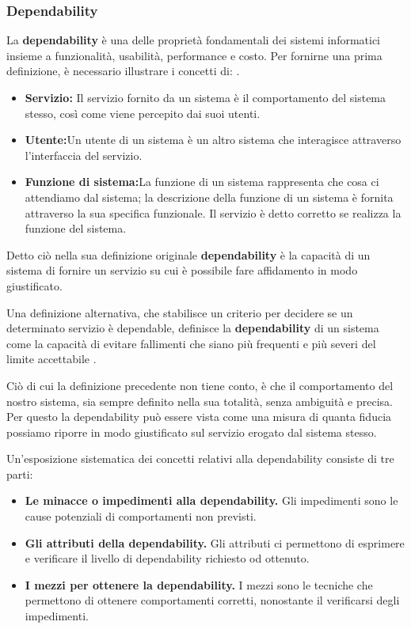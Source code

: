 \documentclass[14pt]{extarticle}
\begin{document}
\subsubsection{Dependability}
La \textbf{dependability} è una delle proprietà fondamentali dei sistemi informatici insieme a funzionalità, usabilità, performance e costo. Per fornirne una prima definizione, è necessario illustrare i concetti di: \cite{avizienis2004basic}.
\begin{itemize}
\item \textbf{Servizio:} Il servizio fornito da un sistema è il comportamento del sistema stesso, così come viene percepito dai suoi utenti.
\item \textbf{Utente:}Un utente di un sistema è un altro sistema che interagisce attraverso l’interfaccia del servizio.
\item \textbf{Funzione di sistema:}La funzione di un sistema rappresenta che cosa ci attendiamo dal sistema; la descrizione della funzione di un sistema è fornita attraverso la sua specifica funzionale. Il servizio è detto corretto se realizza la funzione del sistema.
\end{itemize}

Detto ciò nella sua definizione originale \textbf{dependability} è
la capacità di un sistema di fornire un servizio su cui è possibile fare affidamento in
modo giustificato.\cite{bondavalli2011analisi}

Una definizione alternativa, che stabilisce un criterio per decidere se un determinato servizio è dependable, definisce la \textbf{dependability} di un sistema
come la capacità di evitare fallimenti che siano più frequenti e più severi del
limite accettabile \cite{avizienis2004basic}.

Ciò di cui la definizione precedente non tiene conto, è che il comportamento del nostro sistema, sia sempre definito nella sua totalità, senza ambiguità e precisa. 
Per questo la dependability può essere vista come una misura di quanta fiducia possiamo riporre in modo giustificato sul servizio erogato dal sistema stesso.\cite{bondavalli2011analisi}

Un’esposizione sistematica dei concetti relativi alla dependability consiste di tre parti:

\begin{itemize}
\item \textbf{Le minacce o impedimenti alla dependability.} Gli impedimenti sono le
cause potenziali di comportamenti non previsti.
\item \textbf{Gli attributi della dependability.} Gli attributi ci permettono di esprimere
e verificare il livello di dependability richiesto od ottenuto.
\item \textbf{I mezzi per ottenere la dependability.} I mezzi sono le tecniche che
permettono di ottenere comportamenti corretti, nonostante il verificarsi
degli impedimenti.
\end{itemize}
\end{document}
